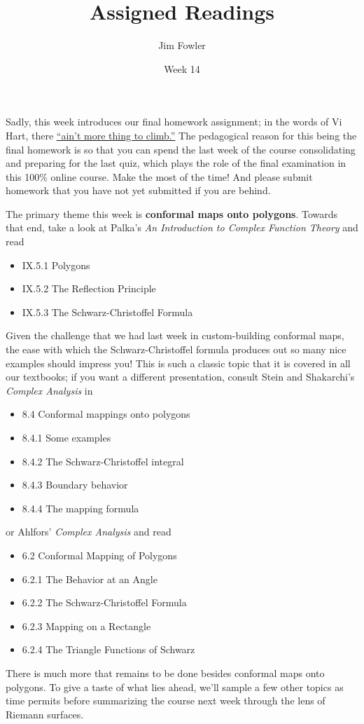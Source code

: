 \documentclass{homework}
\author{Jim Fowler}
\title{Assigned Readings}
\date{Week 14}
\begin{document}
\maketitle

Sadly, this week introduces our final homework assignment; in the
words of Vi Hart, there
\href{https://www.youtube.com/watch?v=UkSN-kqAmxw}{``ain't more thing
  to climb.''}  The pedagogical reason for this being the final
homework is so that you can spend the last week of the course
consolidating and preparing for the last quiz, which plays the role of
the final examination in this 100\% online course.  Make the most of
the time!  And please submit homework that you have not yet submitted
if you are behind.

The primary theme this week is \textbf{conformal maps onto polygons}.  Towards that end, take a look at
Palka's \textit{An Introduction to Complex Function Theory} and read
\begin{itemize}
\item IX.5.1 Polygons
\item IX.5.2 The Reflection Principle
\item IX.5.3 The Schwarz-Christoffel Formula
\end{itemize}
Given the challenge that we had last week in custom-building conformal
maps, the ease with which the Schwarz-Christoffel formula produces out
so many nice examples should impress you!  This is such a classic topic that it is covered in all our textbooks; if you want a different presentation, consult Stein and Shakarchi's \textit{Complex Analysis} in
\begin{itemize}
\item 8.4 Conformal mappings onto polygons
\item 8.4.1 Some examples
\item 8.4.2 The Schwarz-Christoffel integral
\item 8.4.3 Boundary behavior
\item 8.4.4 The mapping formula
\end{itemize}
or Ahlfors' \textit{Complex Analysis} and read
\begin{itemize}
\item 6.2 Conformal Mapping of Polygons
\item 6.2.1 The Behavior at an Angle
\item 6.2.2 The Schwarz-Christoffel Formula
\item 6.2.3 Mapping on a Rectangle
\item 6.2.4 The Triangle Functions of Schwarz
\end{itemize}
There is much more that remains to be done besides conformal maps onto
polygons.  To give a taste of what lies ahead, we'll sample a few
other topics as time permits before summarizing the course next week
through the lens of Riemann surfaces.
\end{document}
